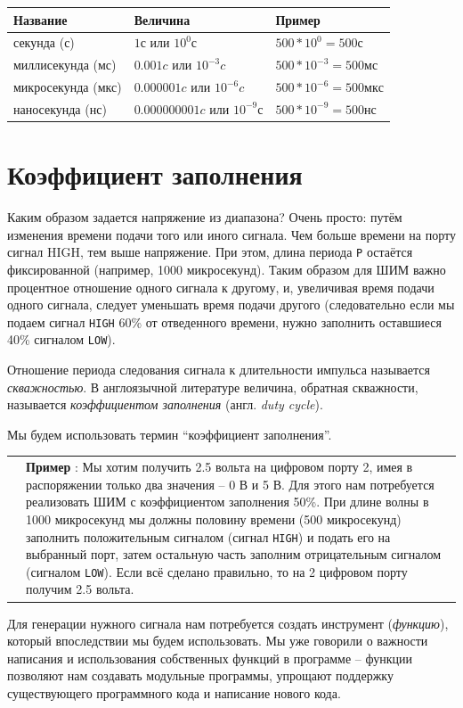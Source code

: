 \documentclass[a4paper,twoside]{book}
\newcounter{example-counter}
\newcommand{\example}[1]{
  \vspace{8pt}
  \begin{tabularx}{\textwidth}{m{1cm} m{9cm}}
    
    & \textbf{Пример \arabic{example-counter}}: #1 \\
  \end{tabularx}
  \addtocounter{example-counter}{1}
}
\begin{document}
\begin{tabular}{p{4cm}|p{4cm}|p{6cm}}
  Название & Величина & Пример \\
  \hline \hline
  секунда (с) & $ 1 с $ или $ 10^0 с $ & $ 500 * 10^{0} = 500 с $ \\
  \hline
  миллисекунда (мс) & $ 0.001 c $ или $ 10^{-3} c $ & $ 500 * 10^{-3} = 500 мс $ \\
  \hline
  микросекунда (мкс) & $ 0.000001 c $ или $ 10^{-6} c $ & $ 500 * 10^{-6} = 500 мкс $ \\
  \hline
  наносекунда (нс) & $ 0.000000001 c $ или $ 10^{-9} с $ & $ 500 * 10^{-9} = 500 нс $
\end{tabular}

\section{Коэффициент заполнения}

Каким образом задается напряжение из диапазона? Очень просто: путём изменения
времени подачи того или иного сигнала. Чем больше времени на порту сигнал HIGH,
тем выше напряжение. При этом, длина периода \texttt{P} остаётся фиксированной
(например, 1000 микросекунд). Таким образом для ШИМ важно процентное отношение
одного сигнала к другому, и, увеличивая время подачи одного сигнала, следует
уменьшать время подачи другого (следовательно если мы подаем сигнал
\texttt{HIGH} 60\% от отведенного времени, нужно заполнить оставшиеся 40\%
сигналом \texttt{LOW}).

Отношение периода следования сигнала к длительности импульса называется
\emph{скважностью}. В англоязычной литературе величина, обратная скважности,
называется \emph{коэффициентом заполнения} (англ. \emph{duty cycle}).

Мы будем использовать термин ``коэффициент заполнения''.

\example {
  Мы хотим получить 2.5 вольта на цифровом порту 2, имея в
  распоряжении только два значения -- 0 В и 5 В. Для этого нам потребуется
  реализовать ШИМ с коэффициентом заполнения 50\%. При длине волны в 1000
  микросекунд мы должны половину времени (500 микросекунд) заполнить
  положительным сигналом (сигнал \texttt{HIGH}) и подать его на выбранный порт, затем
  остальную часть заполним отрицательным сигналом (сигналом \texttt{LOW}).
  Если всё сделано правильно, то на 2 цифровом порту получим 2.5 вольта.
}

Для генерации нужного сигнала нам потребуется создать инструмент
(\emph{функцию}), который впоследствии мы будем использовать. Мы уже говорили о
важности написания и использования собственных функций в программе -- функции
позволяют нам создавать модульные программы, упрощают поддержку существующего
программного кода и написание нового кода.
\end{document}
